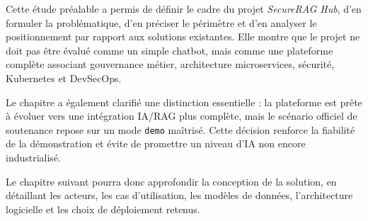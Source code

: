 Cette étude préalable a permis de définir le cadre du projet \textit{SecureRAG Hub}, d'en formuler la problématique, d'en préciser le périmètre et d'en analyser le positionnement par rapport aux solutions existantes. Elle montre que le projet ne doit pas être évalué comme un simple chatbot, mais comme une plateforme complète associant gouvernance métier, architecture microservices, sécurité, Kubernetes et DevSecOps.

Le chapitre a également clarifié une distinction essentielle : la plateforme est prête à évoluer vers une intégration IA/RAG plus complète, mais le scénario officiel de soutenance repose sur un mode \texttt{demo} maîtrisé. Cette décision renforce la fiabilité de la démonstration et évite de promettre un niveau d'IA non encore industrialisé.

Le chapitre suivant pourra donc approfondir la conception de la solution, en détaillant les acteurs, les cas d'utilisation, les modèles de données, l'architecture logicielle et les choix de déploiement retenus.
